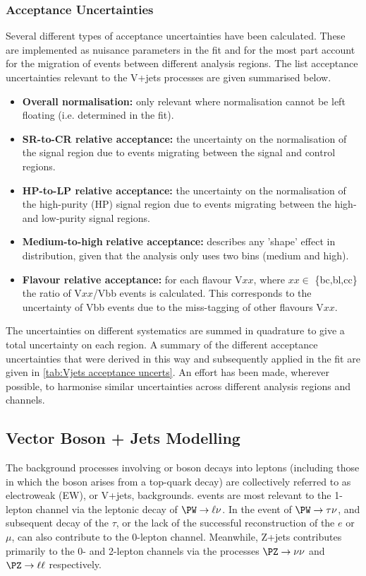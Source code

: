 \subsubsection{Acceptance Uncertainties}
Several different types of acceptance uncertainties have been calculated. These are implemented as nuisance parameters in the fit and for the most part account for the migration of events between different analysis regions. The list acceptance uncertainties relevant to the V+jets processes are given summarised below.
%
\begin{itemize}
    \item \textbf{Overall normalisation:} only relevant where normalisation cannot be left floating (i.e. determined in the fit).
    \item \textbf{SR-to-CR relative acceptance:} the uncertainty on the normalisation of the signal region due to events migrating between the signal and control regions.
    \item \textbf{HP-to-LP relative acceptance:} the uncertainty on the normalisation of the high-purity (HP) signal region due to events migrating between the high- and low-purity signal regions.
    \item \textbf{Medium-to-high} \pTV \textbf{relative acceptance:} describes any 'shape' effect in \pTV distribution, given that the analysis only uses two \pTV bins (medium and high).
    \item \textbf{Flavour relative acceptance:} for each flavour V$xx$, where $xx\in$ \{bc,bl,cc\} the ratio of V$xx$/Vbb events is calculated. This corresponds to the uncertainty of Vbb events due to the miss-tagging of other flavours V$xx$. 
\end{itemize}
%
The uncertainties on different systematics are summed in quadrature to give a total uncertainty on each region. A summary of the different acceptance uncertainties that were derived in this way and subsequently applied in the fit are given in \cref{tab:Vjets acceptance uncerts}. An effort has been made, wherever possible, to harmonise similar uncertainties across different analysis regions and channels.


\subsection{Vector Boson + Jets Modelling}
The background processes involving \Wboson or \Zboson boson decays into leptons (including those in which the \Wboson boson arises from a top-quark decay) are collectively referred to as electroweak (EW), or V+jets, backgrounds.
\Wjets events are most relevant to the 1-lepton channel via the leptonic decay of $\Wboson \rightarrow \ell\nu$.
In the event of $\Wboson \rightarrow \tau\nu$, and subsequent decay of the $\tau$, or the lack of the successful reconstruction of the $e$ or $\mu$, \Wjets can also contribute to the 0-lepton channel.
Meanwhile, Z+jets contributes primarily to the 0- and 2-lepton channels via the processes $\Zboson \rightarrow \nu\nu$ and $\Zboson \rightarrow \ell\ell$ respectively.

